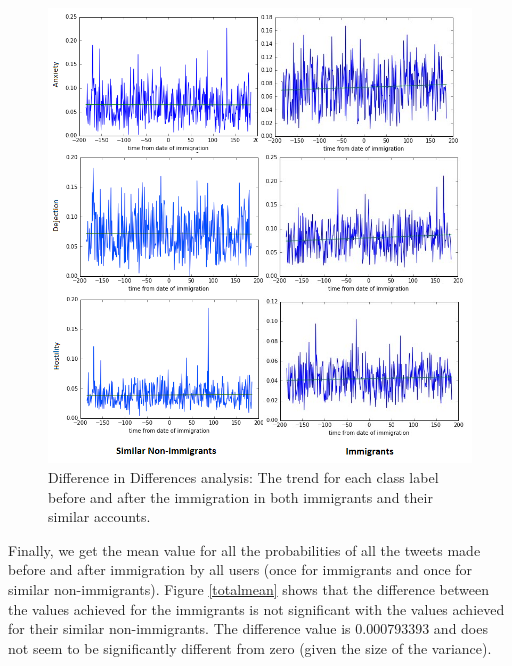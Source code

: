 \documentclass{article}
\begin{document}
\begin{figure}[ht]
\vskip 0.1in
\begin{center}
\centerline{\includegraphics[width=\columnwidth]{Figures/diffindiff.png}}
\caption{Difference in Differences analysis: The trend for each class label before and after the immigration in both immigrants and their similar accounts. }
\label{diffindiff}
\end{center}
\vskip -0.2in
\end{figure}

Finally, we get the mean value for all the probabilities of all the tweets made before and after immigration by all users (once for immigrants and once for similar non-immigrants). Figure \ref{totalmean} shows that the difference between the values achieved for the immigrants is not significant with the values achieved for their similar non-immigrants. The difference value is 0.000793393 and does not seem to be significantly different from zero (given the size of the variance).
\end{document}
